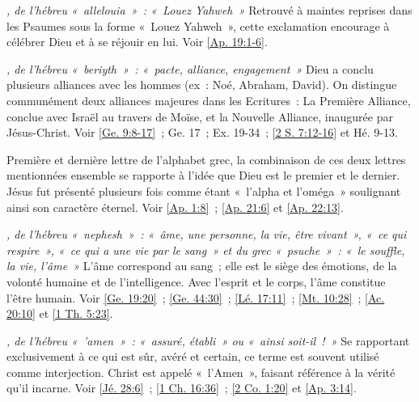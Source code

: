 \begin{multicols}{2}
\textit{, de l'hébreu «~allelouia~»~: «~Louez Yahweh~»}\newline
Retrouvé à maintes reprises dans les Psaumes sous la forme «~Louez Yahweh~», cette exclamation encourage à célébrer Dieu et à se réjouir en lui.\newline
Voir \vref{Ap. 19:1-6}.

\textit{, de l'hébreu «~beriyth~»~: «~pacte, alliance, engagement~»}\newline
Dieu a conclu plusieurs alliances avec les hommes (ex~: Noé, Abraham, David). On distingue communément deux alliances majeures dans les Ecritures~: La Première Alliance, conclue avec Israël au travers de Moïse, et la Nouvelle Alliance, inaugurée par Jésus-Christ.\newline
Voir \vref{Ge. 9:8-17}~; Ge. 17~; Ex. 19-34~; \vref{2 S. 7:12-16} et Hé. 9-13.

\textit{}\newline
Première et dernière lettre de l'alphabet grec, la combinaison de ces deux lettres mentionnées ensemble se rapporte à l'idée que Dieu est le premier et le dernier. Jésus fut présenté plusieurs fois comme étant «~l'alpha et l'oméga~» soulignant ainsi son caractère éternel. Voir \vref{Ap. 1:8}~; \vref{Ap. 21:6} et \vref{Ap. 22:13}.

\textit{, de l'hébreu «~nephesh~»~: «~âme, une personne, la vie, être vivant~», «~ce qui respire~», «~ce qui a une vie par le sang~» et du grec «~psuche~»~: «~le souffle, la vie, l'âme~»}\newline
L'âme correspond au sang~; elle est le siège des émotions, de la volonté humaine et de l'intelligence. Avec l'esprit et le corps, l'âme constitue l'être humain.\newline
Voir \vref{Ge. 19:20}~; \vref{Ge. 44:30}~; \vref{Lé. 17:11}~; \vref{Mt. 10:28}~; \vref{Ac. 20:10} et \vref{1 Th. 5:23}.

\textit{, de l'hébreu «~'amen~»~: «~assuré, établi~» ou «~ainsi soit-il~!~»}\newline
Se rapportant exclusivement à ce qui est sûr, avéré et certain, ce terme est souvent utilisé comme interjection. Christ est appelé «~l'Amen~», faisant référence à la vérité qu'il incarne.\newline
Voir \vref{Jé. 28:6}~; \vref{1 Ch. 16:36}~; \vref{2 Co. 1:20} et \vref{Ap. 3:14}.


\end{multicols}
